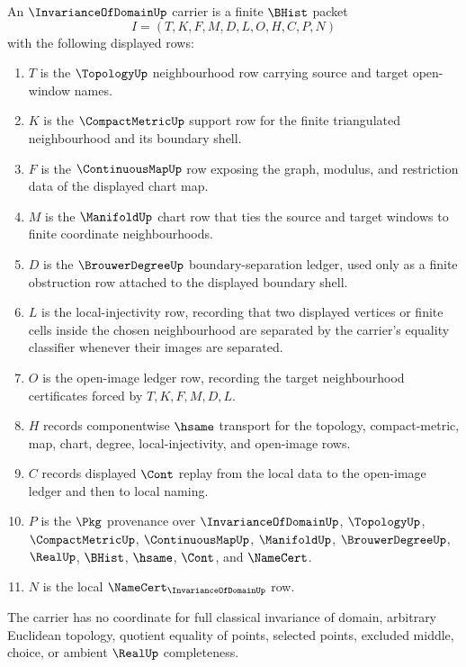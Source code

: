 \begin{definition}
\label{def:invariance-of-domain-carrier}
An $\InvarianceOfDomainUp$ carrier is a finite $\BHist$ packet
$$
I=(T,K,F,M,D,L,O,H,C,P,N)
$$
with the following displayed rows:
\begin{enumerate}
\item $T$ is the $\TopologyUp$ neighbourhood row carrying source and target open-window names.
\item $K$ is the $\CompactMetricUp$ support row for the finite triangulated neighbourhood and its boundary shell.
\item $F$ is the $\ContinuousMapUp$ row exposing the graph, modulus, and restriction data of the displayed chart map.
\item $M$ is the $\ManifoldUp$ chart row that ties the source and target windows to finite coordinate neighbourhoods.
\item $D$ is the $\BrouwerDegreeUp$ boundary-separation ledger, used only as a finite obstruction row attached to the displayed boundary shell.
\item $L$ is the local-injectivity row, recording that two displayed vertices or finite cells inside the chosen neighbourhood are separated by the carrier's equality classifier whenever their images are separated.
\item $O$ is the open-image ledger row, recording the target neighbourhood certificates forced by $T,K,F,M,D,L$.
\item $H$ records componentwise $\hsame$ transport for the topology, compact-metric, map, chart, degree, local-injectivity, and open-image rows.
\item $C$ records displayed $\Cont$ replay from the local data to the open-image ledger and then to local naming.
\item $P$ is the $\Pkg$ provenance over $\InvarianceOfDomainUp$, $\TopologyUp$, $\CompactMetricUp$, $\ContinuousMapUp$, $\ManifoldUp$, $\BrouwerDegreeUp$, $\RealUp$, $\BHist$, $\hsame$, $\Cont$, and $\NameCert$.
\item $N$ is the local $\NameCert_{\InvarianceOfDomainUp}$ row.
\end{enumerate}
The carrier has no coordinate for full classical invariance of domain, arbitrary Euclidean topology, quotient equality of points, selected points, excluded middle, choice, or ambient $\RealUp$ completeness.
\end{definition}


